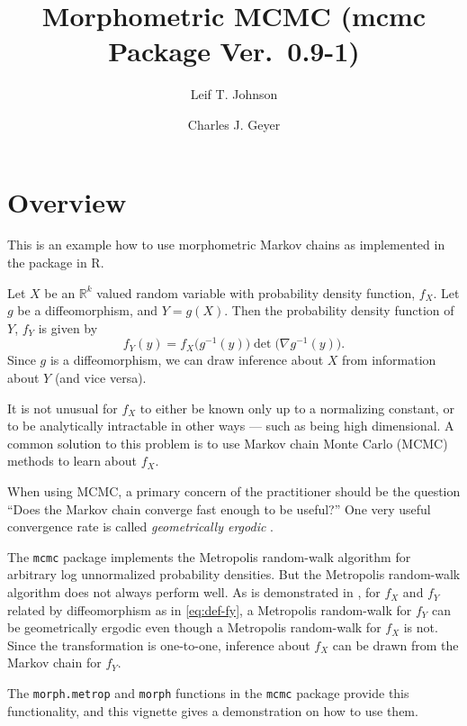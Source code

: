 \documentclass{article}
\begin{document}
\title{Morphometric MCMC (mcmc Package Ver.~0.9-1)}
\author{Leif T. Johnson \and Charles J. Geyer}
\maketitle

\section{Overview}

This is an example how to use morphometric Markov chains as implemented in
the \verb@mcmc@ package in R.

Let $X$ be an $\mathbb{R}^k$ valued random variable with probability density
function, $f_X$.  Let $g$ be a diffeomorphism, and $Y=g(X)$.  Then the
probability density function of $Y$, $f_Y$ is given by
\begin{equation}\label{eq:def-fy}
  f_Y(y) = f_X\bigl(g^{-1}(y)\bigr) \det\bigl( \nabla g^{-1}(y) \bigr).
\end{equation}
Since $g$ is a diffeomorphism, we can draw inference about $X$ from information
about $Y$ (and vice versa).

It is not unusual for $f_X$ to either be known only up to a normalizing
constant, or to be analytically intractable in other ways --- such as
being high dimensional.
A common solution to this problem is to use Markov chain
Monte Carlo (MCMC) methods to learn about $f_X$.

When using MCMC, a primary concern of the practitioner should be the question
``Does the Markov chain converge fast enough to be useful?''  One very useful
convergence rate is called \emph{geometrically ergodic}
\citep[Chapter~1]{johnson-thesis}.

The \texttt{mcmc} package implements the Metropolis random-walk algorithm for
arbitrary log unnormalized probability densities.  But the Metropolis
random-walk algorithm does not always perform well.  As is demonstrated in
\citet{johnson-geyer}, for $f_X$ and $f_Y$ related by diffeomorphism as in
\eqref{eq:def-fy}, a Metropolis random-walk for $f_Y$ can be geometrically
ergodic
even though a Metropolis random-walk for $f_X$ is not.
Since the transformation is
one-to-one, inference about $f_X$ can be drawn from the Markov chain for $f_Y$.

The \texttt{morph.metrop} and \texttt{morph} functions in the \texttt{mcmc}
package provide this functionality, and this vignette gives a demonstration
on how to use them.
\end{document}
